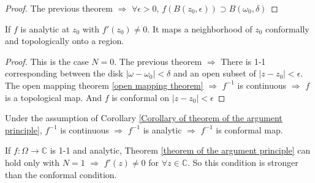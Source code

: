 \begin{proof}
    The previous theorem  $ \Rightarrow $ $ \forall \epsilon>0 $,  $ f(B(z_0,\epsilon))\supset B(\omega_0,\delta) $   
\end{proof}
\begin{corollary}\label{Corollary of theorem of the argument principle}
    If  $ f $ is analytic at  $ z_0 $ with  $ f'(z_0)\neq 0 $. It maps a neighborhood of  $ z_0 $ conformally and topologically onto a region.   
\end{corollary}
\begin{proof}
    This is the case  $ N=0 $. The previous theorem  $ \Rightarrow  $ There is 1-1 corresponding between the disk  $ |\omega-\omega_0|<\delta $ and an open subset of  $ |z-z_0|<\epsilon $. The open mapping theorem \ref{open mapping theorem} $ \Rightarrow $  $ f^{-1} $ is continuous  $ \Rightarrow  $ $ f $ is a topological map. And  
    $ f $ is conformal  on  $ |z-z_0|<\epsilon $ 
\end{proof}
\begin{remark}
    Under the assumption of Corollary \ref{Corollary of theorem of the argument principle},  $ f^{-1} $ is continuous  $ \Rightarrow  $ $ f^{-1} $ is analytic $ \Rightarrow $ $ f^{-1} $ is conformal map.  
    
    If  $ f:\Omega\rightarrow \mathbb{C} $ is 1-1 and analytic,  Theorem \ref{theorem of the argument principle} can hold only with  $ N=1 $ $ \Rightarrow $ $ f'(z)\neq 0 $ for  $ \forall z\in\mathbb{C} $. So this condition is stronger than the conformal condition.    
\end{remark}
